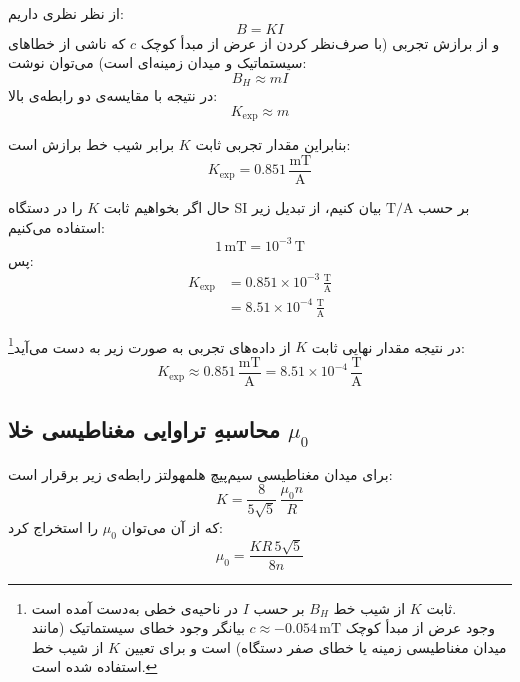 \documentclass[a4paper, 11pt]{article}
\begin{document}
از نظر نظری داریم:
\begin{equation}
B = KI
\end{equation}
و از برازش تجربی (با صرف‌نظر کردن از عرض از مبدأ کوچک \(c\) که ناشی از خطاهای سیستماتیک و میدان زمینه‌ای است) می‌توان نوشت:
\begin{equation}
B_H \approx m I
\end{equation}
در نتیجه با مقایسه‌ی دو رابطه‌ی بالا:
\begin{equation}
K_{\mathrm{exp}} \approx m
\end{equation}

بنابراین مقدار تجربی ثابت \(K\) برابر شیب خط برازش است:
\begin{equation}
K_{\mathrm{exp}} = 0.851 \,\frac{\mathrm{mT}}{\mathrm{A}}
\end{equation}

حال اگر بخواهیم ثابت \(K\) را در دستگاه SI بر حسب \(\mathrm{T/A}\) بیان کنیم، از تبدیل زیر استفاده می‌کنیم:
\begin{equation}
1\,\mathrm{mT} = 10^{-3}\,\mathrm{T}
\end{equation}
پس:
\begin{align}
K_{\mathrm{exp}} 
&= 0.851 \times 10^{-3} \,\frac{\mathrm{T}}{\mathrm{A}} \\
&= 8.51 \times 10^{-4} \,\frac{\mathrm{T}}{\mathrm{A}}
\end{align}

در نتیجه مقدار نهایی ثابت \(K\) از داده‌های تجربی به صورت زیر به دست می‌آید\footnote{
     ثابت \(K\) از شیب خط \(B_H\) بر حسب \(I\) در ناحیه‌ی خطی به‌دست آمده است.\\
     وجود عرض از مبدأ کوچک \(c \approx -0.054\,\mathrm{mT}\) بیانگر وجود خطای سیستماتیک (مانند میدان مغناطیسی زمینه یا خطای صفر دستگاه) است و برای تعیین \(K\) از شیب خط استفاده شده است.
}:
\begin{equation}
K_{\mathrm{exp}} \approx 0.851\,\frac{\mathrm{mT}}{\mathrm{A}}
= 8.51 \times 10^{-4}\,\frac{\mathrm{T}}{\mathrm{A}}
\end{equation}

\subsection{محاسبهِ تراوایی مغناطیسی خلا $\mu_0$}

برای میدان مغناطیسی سیم‌پیچ هلمهولتز رابطه‌ی زیر برقرار است:
\begin{equation}
K = \frac{8}{5\sqrt{5}}\,\frac{\mu_0 n}{R}
\end{equation}
که از آن می‌توان \(\mu_0\) را استخراج کرد:
\begin{equation}
\mu_0 = \frac{K R\, 5\sqrt{5}}{8 n}
\end{equation}
\end{document}
